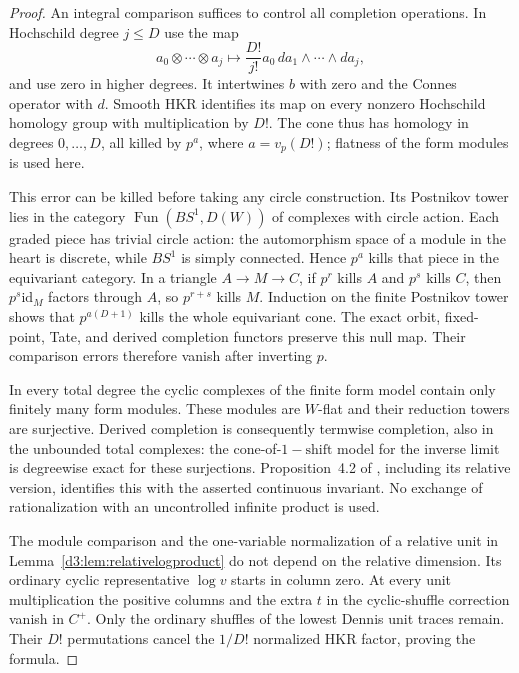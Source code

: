 \begin{proof}
An integral comparison suffices to control all completion operations.
In Hochschild degree $j\leq D$ use the map
\[
 a_0\otimes\cdots\otimes a_j\longmapsto
       \frac{D!}{j!}a_0\,da_1\wedge\cdots\wedge da_j,
\]
and use zero in higher degrees. It intertwines $b$ with zero and
the Connes operator with $d$. Smooth HKR identifies its map on every
nonzero Hochschild homology group with multiplication by $D!$.
The cone thus has homology in degrees $0,\ldots,D$, all killed by
$p^a$, where $a=v_p(D!)$; flatness of the form modules is used here.

This error can be killed before taking any circle construction.
Its Postnikov tower lies in the category
$\operatorname{Fun}(BS^1,D(W))$ of complexes with circle action.
Each graded piece has trivial circle action: the automorphism
space of a module in the heart is discrete, while $BS^1$ is simply
connected. Hence $p^a$ kills that piece in the equivariant category.
In a triangle $A\to M\to C$, if $p^r$ kills $A$ and $p^s$ kills
$C$, then $p^s\mathrm{id}_M$ factors through $A$, so $p^{r+s}$
kills $M$. Induction on the finite Postnikov tower shows that
$p^{a(D+1)}$ kills the whole equivariant cone.
The exact orbit, fixed-point, Tate, and derived completion functors
preserve this null map. Their comparison errors therefore vanish
after inverting $p$.

In every total degree the cyclic complexes of the finite form
model contain only finitely many form modules. These modules are
$W$-flat and their reduction towers are surjective. Derived
completion is consequently termwise completion, also in the
unbounded total complexes: the cone-of-$1-\mathrm{shift}$ model
for the inverse limit is degreewise exact for these surjections.
Proposition~4.2 of \cite{AMMN}, including its relative version,
identifies this with the asserted continuous invariant. No exchange
of rationalization with an uncontrolled infinite product is used.

The module comparison and the one-variable normalization of a
relative unit in Lemma~\ref{d3:lem:relativelogproduct} do not depend
on the relative dimension. Its ordinary cyclic representative
$\log v$ starts in column zero. At every unit multiplication the
positive columns and the extra $t$ in the cyclic-shuffle correction
vanish in $C^+$. Only the ordinary shuffles of the lowest Dennis
unit traces remain. Their $D!$ permutations cancel the $1/D!$
normalized HKR factor, proving the formula.
\end{proof}

